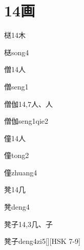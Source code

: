 
\section*{14画}

\begin{Entry}{㮸}{14}{⽊}
  \begin{Phonetics}{㮸}{song4}
  \end{Phonetics}
\end{Entry}

\begin{Entry}{僧}{14}{⼈}
  \begin{Phonetics}{僧}{seng1}
  \end{Phonetics}
\end{Entry}

\begin{Entry}{僧伽}{14,7}{⼈、⼈}
  \begin{Phonetics}{僧伽}{seng1qie2}
  \end{Phonetics}
\end{Entry}

\begin{Entry}{僮}{14}{⼈}
  \begin{Phonetics}{僮}{tong2}
  \end{Phonetics}
  \begin{Phonetics}{僮}{zhuang4}
  \end{Phonetics}
\end{Entry}

\begin{Entry}{凳}{14}{⼏}
  \begin{Phonetics}{凳}{deng4}
  \end{Phonetics}
\end{Entry}

\begin{Entry}{凳子}{14,3}{⼏、⼦}
  \begin{Phonetics}{凳子}{deng4zi5}[][HSK 7-9]
  \end{Phonetics}
\end{Entry}

